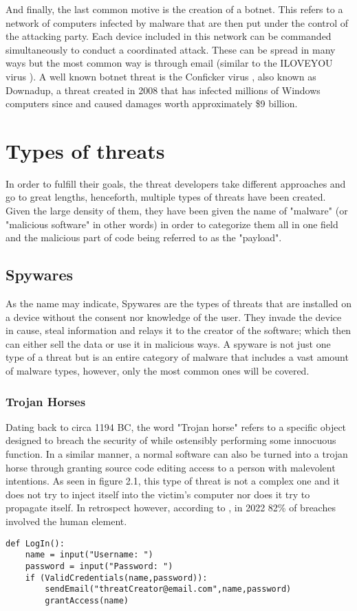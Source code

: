 \noindent And finally, the last common motive is the creation of a botnet. This refers to a network of computers infected by malware that are then put under the control of the attacking party. Each device included in this network can be commanded simultaneously to conduct a coordinated attack. These can be spread in many ways but the most common way is through email (similar to the ILOVEYOU virus \cite{knight2000iloveyou}). A well known botnet threat is the Conficker virus \cite{kaskaconficker}, also known as Downadup, a threat created in 2008 that has infected millions of Windows computers since and caused damages worth approximately \$9 billion.


\section{Types of threats}\label{chap:threattypes}
In order to fulfill their goals, the threat developers take different approaches and go to great lengths, henceforth, multiple types of threats have been created. Given the large density of them, they have been given the name of "malware" (or "malicious software" in other words) in order to categorize them all in one field and the malicious part of code being referred to as the "payload". 

\subsection{Spywares}
\noindent As the name may indicate, Spywares are the types of threats that are installed on a device without the consent nor knowledge of the user. They invade the device in cause, steal information and relays it to the creator of the software; which then can either sell the data or use it in malicious ways. A spyware is not just one type of a threat but is an entire category of malware that includes a vast amount of malware types, however, only the most common ones will be covered.

\subsubsection{Trojan Horses}
Dating back to circa 1194 BC, the word "Trojan horse" refers to a specific object designed to breach the security of while ostensibly performing some innocuous function. In a similar manner, a normal software can also be turned into a trojan horse through granting source code editing access to a person with malevolent intentions. As seen in figure 2.1, this type of threat is not a complex one and it does not try to inject itself into the victim's computer nor does it try to propagate itself. In retrospect however, according to \cite{mansfield2022verizon}, in 2022 82\% of breaches involved the human element. 
\begin{lstlisting}[caption = Trojan Horse Code Example, columns=fixed, basewidth=0.5em, basicstyle={\ttfamily}, frame=single]
def LogIn():
    name = input("Username: ")
    password = input("Password: ")
    if (ValidCredentials(name,password)):
        sendEmail("threatCreator@email.com",name,password)
        grantAccess(name)
\end{lstlisting}

